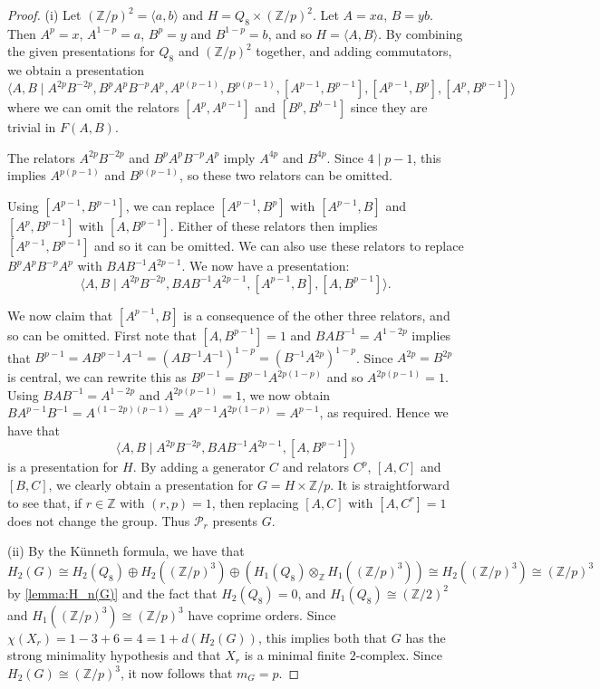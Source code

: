 \documentclass[10pt,a4paper]{amsart}
\newcommand{\Z}{\mathbb{Z}}
\begin{document}
\begin{proof}
(i)
Let $(\Z/p)^2 =\langle a, b \rangle$ and $H = Q_8 \times (\Z/p)^2$. Let $A=xa$, $B=yb$. Then $A^p=x$, $A^{1-p}=a$, $B^p=y$ and $B^{1-p}=b$, and so $H = \langle A, B \rangle$. By combining the given presentations for $Q_8$ and $(\Z/p)^2$ together, and adding commutators, we obtain a presentation
\[ \langle A, B \mid A^{2p}B^{-2p}, B^pA^pB^{-p}A^p, A^{p(p-1)}, B^{p(p-1)}, [A^{p-1},B^{p-1}],[A^{p-1},B^p], [A^p,B^{p-1}]\rangle  \]
where we can omit the relators $[A^p,A^{p-1}]$ and $[B^p,B^{b-1}]$ since they are trivial in $F(A,B)$.

The relators $A^{2p}B^{-2p}$ and $B^pA^pB^{-p}A^p$ imply $A^{4p}$ and $B^{4p}$. Since $4 \mid p-1$, this implies $A^{p(p-1)}$ and $B^{p(p-1)}$, so these two relators can be omitted.

Using $[A^{p-1},B^{p-1}]$, we can replace $[A^{p-1},B^p]$ with $[A^{p-1},B]$ and $[A^p,B^{p-1}]$ with $[A,B^{p-1}]$. Either of these relators then implies $[A^{p-1},B^{p-1}]$ and so it can be omitted. We can also use these relators to replace $B^pA^pB^{-p}A^p$ with $BAB^{-1}A^{2p-1}$.
We now have a presentation:
\[ \langle A, B \mid A^{2p}B^{-2p}, BAB^{-1}A^{2p-1}, [A^{p-1},B], [A,B^{p-1}]\rangle.  \]

We now claim that $[A^{p-1},B]$ is a consequence of the other three relators, and so can be omitted. First  note that $[A,B^{p-1}]=1$ and $BAB^{-1}=A^{1-2p}$ implies that $B^{p-1} = AB^{p-1}A^{-1} = (AB^{-1}A^{-1})^{1-p}=(B^{-1}A^{2p})^{1-p}$. Since $A^{2p}=B^{2p}$ is central, we can rewrite this as $B^{p-1} = B^{p-1}A^{2p(1-p)}$ and so $A^{2p(p-1)}=1$. Using $BAB^{-1}=A^{1-2p}$ and $A^{2p(p-1)}=1$, we now obtain $BA^{p-1}B^{-1} = A^{(1-2p)(p-1)} = A^{p-1} A^{2p(1-p)} = A^{p-1}$, as required.
Hence we have that 
\[ \langle A, B \mid A^{2p}B^{-2p}, BAB^{-1}A^{2p-1}, [A,B^{p-1}]\rangle \]
is a presentation for $H$. By adding a generator $C$ and relators $C^p$, $[A,C]$ and $[B,C]$, we clearly obtain a presentation for $G = H \times \Z/p$. It is straightforward to see that, if $r \in \Z$ with $(r,p)=1$, then replacing $[A,C]$ with $[A,C^r]=1$ does not change the group. Thus $\mathcal{P}_r$ presents $G$.

(ii) By the K\"{u}nneth formula, we have that
\[ H_2(G) \cong H_2(Q_8) \oplus H_2((\Z/p)^3) \oplus (H_1(Q_8) \otimes_{\Z} H_1((\Z/p)^3)) \cong H_2((\Z/p)^3) \cong (\Z/p)^3 \]
by \cref{lemma:H_n(G)} and the fact that $H_2(Q_8)=0$, and $H_1(Q_8) \cong (\Z/2)^2$ and $H_1((\Z/p)^3) \cong (\Z/p)^3$ have coprime orders. Since $\chi(X_r) = 1-3+6=4=1+d(H_2(G))$, this implies both that $G$ has the strong minimality hypothesis and that $X_r$ is a minimal finite $2$-complex. Since $H_2(G) \cong (\Z/p)^3$, it now follows that $m_G = p$.
\end{proof}
\end{document}

